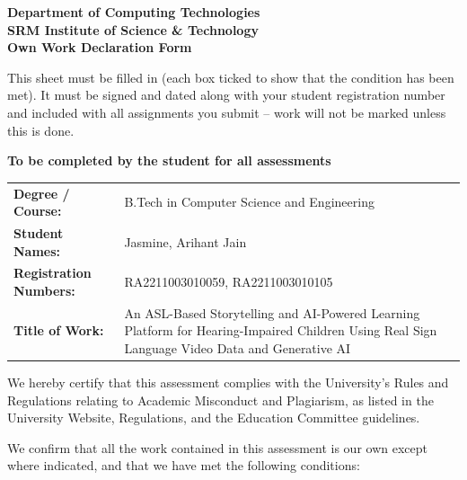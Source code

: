 \documentclass[12pt,a4paper,oneside]{report}
\begin{document}
\thispagestyle{empty}
\begin{center}
{\bfseries Department of Computing Technologies\\
SRM Institute of Science \& Technology\\[0.4em]
Own Work Declaration Form\par}
\end{center}

\noindent\small
This sheet must be filled in (each box ticked to show that the condition has been met). It must be signed and dated along with your student registration number and included with all assignments you submit -- work will not be marked unless this is done.

\vspace{0.4em}
\noindent\textbf{To be completed by the student for all assessments}

\vspace{0.6em}
\noindent\begin{tabularx}{\linewidth}{@{}lX@{}}
\textbf{Degree / Course:} & B.Tech in Computer Science and Engineering \\[0.3em]
\textbf{Student Names:} & Jasmine, Arihant Jain \\[0.3em]
\textbf{Registration Numbers:} & RA2211003010059, RA2211003010105 \\[0.3em]
\textbf{Title of Work:} & An ASL-Based Storytelling and AI-Powered Learning Platform for Hearing-Impaired Children Using Real Sign Language Video Data and Generative AI \\
\end{tabularx}

\vspace{0.8em}
\noindent We hereby certify that this assessment complies with the University's Rules and Regulations relating to Academic Misconduct and Plagiarism, as listed in the University Website, Regulations, and the Education Committee guidelines.

\vspace{0.4em}
\noindent We confirm that all the work contained in this assessment is our own except where indicated, and that we have met the following conditions:
\end{document}
